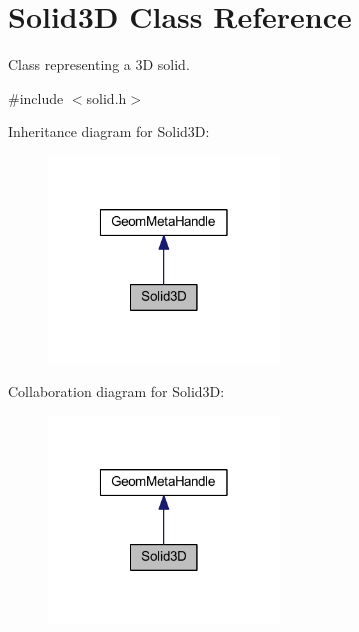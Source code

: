 \hypertarget{class_solid3_d}{\section{Solid3\-D Class Reference}
\label{class_solid3_d}
}


Class representing a 3\-D solid.  




{\ttfamily \#include $<$solid.\-h$>$}



Inheritance diagram for Solid3\-D\-:\nopagebreak
\begin{figure}[H]
\begin{center}
\leavevmode
\includegraphics[width=174pt]{class_solid3_d__inherit__graph}
\end{center}
\end{figure}


Collaboration diagram for Solid3\-D\-:\nopagebreak
\begin{figure}[H]
\begin{center}
\leavevmode
\includegraphics[width=174pt]{class_solid3_d__coll__graph}
\end{center}
\end{figure}
